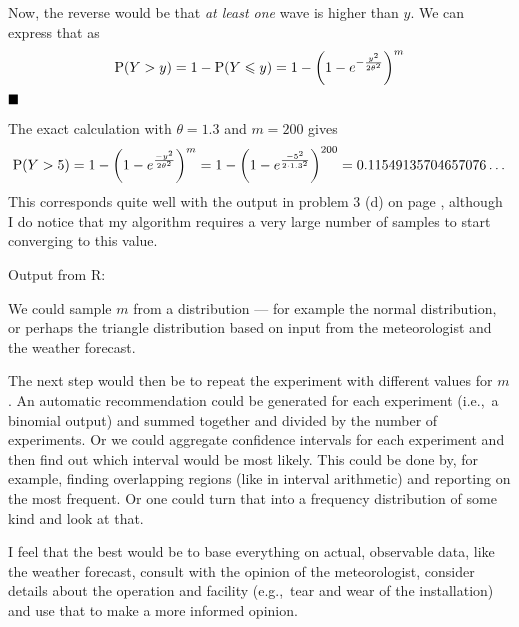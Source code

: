 \documentclass[a4paper,english,12pt]{article}
\begin{document}
Now, the reverse would be that \textit{at least one} wave is higher than $y$.
We can express that as
\[
  \mathrm{P}(Y > y)
    = 1 - \mathrm{P}(Y \leqslant y)
    = 1 - \left(1 - e^{-\frac{y^2}{2\theta^2}} \right)^m
\]
$\hfill\blacksquare$

The exact calculation with $\theta=1.3$ and $m=200$ gives
\[
  \mathrm{P}(Y>5)
    = 1 - \left(1 - e^{\frac{-y^2}{2\theta^2}} \right)^m
    = 1 - \left(1 - e^{\frac{-5^2}{2\cdot1.3^2}} \right)^{200}
    = 0.11549135704657076\dots
\]
This corresponds quite well with the output in problem 3 (d) on page
\pageref{problem:3d}, although I do notice that my algorithm requires a very
large number of samples to start converging to this value.

Output from R:

We could sample $m$ from a distribution --- for example the normal
distribution, or perhaps the triangle distribution based on input from the
meteorologist and the weather forecast.

The next step would then be to repeat the experiment with different values for
$m$. An automatic recommendation could be generated for each experiment
(i.e.,~a binomial output) and summed together and divided by the number of
experiments. Or we could aggregate confidence intervals for each experiment and
then find out which interval would be most likely. This could be done by, for
example, finding overlapping regions (like in interval arithmetic) and
reporting on the most frequent. Or one could turn that into a frequency
distribution of some kind and look at that.

I feel that the best would be to base everything on actual, observable data,
like the weather forecast, consult with the opinion of the meteorologist,
consider details about the operation and facility (e.g.,~tear and wear of the
installation) and use that to make a more informed opinion.

\clearpage


\end{document}

